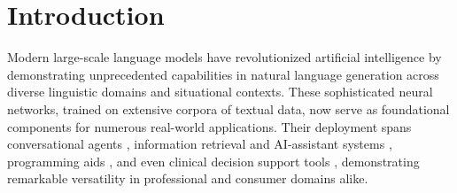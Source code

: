 \documentclass[nonblindrev]{informs3_hide}
\newcommand{\sortF}{\texttt{Sorted-F}}
\begin{document}
{%
}
\maketitle


\section{Introduction} \label{sec:intro}

Modern large-scale language models \citep{brown2020language,openai2023gpt} have revolutionized artificial intelligence by demonstrating unprecedented capabilities in natural language generation across diverse linguistic domains and situational contexts. These sophisticated neural networks, trained on extensive corpora of textual data, now serve as foundational components for numerous real-world applications. Their deployment spans conversational agents \citep{anthropic2023claude, openai2023gpt}, information retrieval and AI-assistant systems \citep{microsoftcopilot2026}, programming aids \citep{githubcopilot2026}, and even clinical decision support tools \citep{cascella2023evaluating}, demonstrating remarkable versatility in professional and consumer domains alike.
\end{document}

